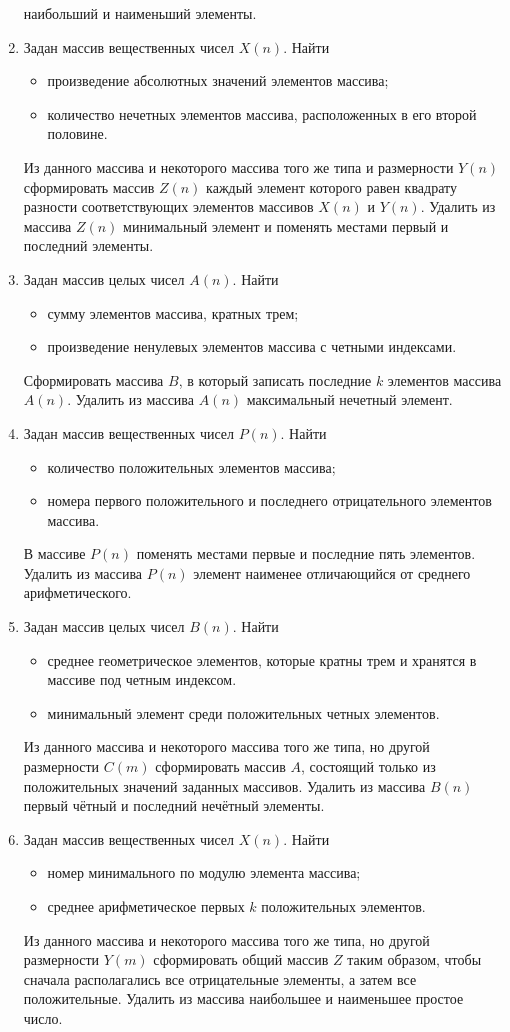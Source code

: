 \begin{enumerate}
наибольший и наименьший элементы.
\item Задан массив вещественных чисел $X(n)$. Найти
\begin{itemize}
\item произведение абсолютных значений элементов массива;
\item количество нечетных элементов массива, расположенных в его второй половине.
\end{itemize}
Из данного массива и некоторого массива того же типа и размерности $Y(n)$ сформировать
массив $Z(n)$ каждый элемент которого равен квадрату разности соответствующих элементов
массивов $X(n)$ и $Y(n)$. Удалить из массива
$Z(n)$ минимальный элемент и поменять местами первый и последний элементы.
\item Задан массив целых чисел $A(n)$. Найти
\begin{itemize}
\item сумму элементов массива, кратных трем;
\item произведение ненулевых элементов массива с четными индексами.
\end{itemize}
Сформировать массива $B$, в который записать последние $k$ элементов массива
$A(n)$. Удалить из массива $A(n)$ максимальный нечетный элемент.
\item Задан массив вещественных чисел $P(n)$. Найти
\begin{itemize}
\item количество положительных элементов массива;
\item номера первого положительного и последнего отрицательного элементов массива.
\end{itemize}
В массиве $P(n)$ поменять местами первые и последние пять элементов. Удалить из массива
$P(n)$ элемент наименее отличающийся от среднего арифметического.
\item Задан массив целых чисел $B(n)$. Найти
\begin{itemize}
\item среднее геометрическое элементов, которые кратны трем и хранятся в массиве под четным индексом.
\item минимальный элемент среди положительных четных элементов.
\end{itemize}
Из данного массива и некоторого массива того же типа, но другой размерности $C(m)$
сформировать массив $A$, состоящий только из положительных значений заданных массивов. Удалить из
массива $B(n)$ первый чётный и последний нечётный элементы.
\item Задан массив вещественных чисел $X(n)$. Найти
\begin{itemize}
\item номер минимального по модулю элемента массива;
\item среднее арифметическое первых $k$ положительных элементов.
\end{itemize}
Из данного массива и некоторого массива того же типа, но другой размерности $Y(m)$
сформировать общий массив $Z$ таким образом, чтобы сначала располагались все отрицательные элементы, а
затем все положительные. Удалить из массива наибольшее и наименьшее простое число.
\end{enumerate}

